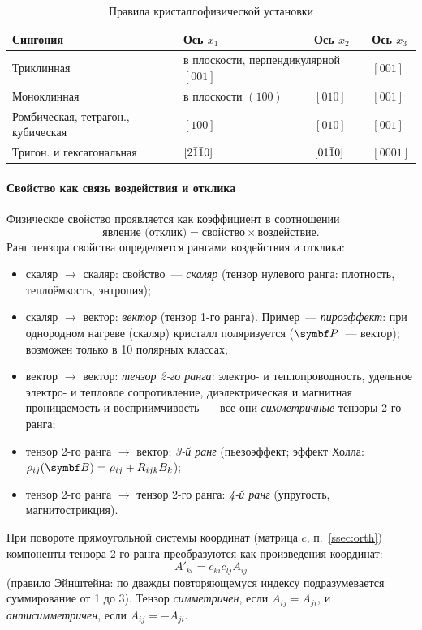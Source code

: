 \begin{table}[ht]
\centering
\caption{Правила кристаллофизической установки}\label{tab:physaxes}
\small
\begin{tabular}{@{}llll@{}}
\toprule
Сингония & Ось $x_1$ & Ось $x_2$ & Ось $x_3$\\
\midrule
Триклинная & \multicolumn{2}{l}{в плоскости, перпендикулярной $[001]$} & $[001]$\\
Моноклинная & в плоскости $(100)$ & $[010]$ & $[001]$\\
Ромбическая, тетрагон., кубическая & $[100]$ & $[010]$ & $[001]$\\
Тригон. и гексагональная & $[2\bar{1}\bar{1}0]$ & $[01\bar{1}0]$ & $[0001]$\\
\bottomrule
\end{tabular}
\end{table}

\paragraph{Свойство как связь воздействия и отклика}
Физическое свойство проявляется как коэффициент в соотношении
\begin{equation}\label{eq:property}
\text{явление (отклик)}=\text{свойство}\times\text{воздействие} .
\end{equation}
Ранг тензора свойства определяется рангами воздействия и отклика:
\begin{itemize}
\item скаляр $\to$ скаляр: свойство~— \emph{скаляр} (тензор нулевого
ранга: плотность, теплоёмкость, энтропия);
\item скаляр $\to$ вектор: \emph{вектор} (тензор 1-го ранга). Пример~—
\emph{пироэффект}: при однородном нагреве (скаляр) кристалл поляризуется
($\vb P$~— вектор); возможен только в 10 полярных классах;
\item вектор $\to$ вектор: \emph{тензор 2-го ранга}: электро- и
теплопроводность, удельное электро- и тепловое сопротивление,
диэлектрическая и магнитная проницаемость и восприимчивость~— все они
\emph{симметричные} тензоры 2-го ранга;
\item тензор 2-го ранга $\to$ вектор: \emph{3-й ранг} (пьезоэффект; эффект
Холла: $\rho_{ij}(\vb B)=\rho_{ij}+R_{ijk}B_k$);
\item тензор 2-го ранга $\to$ тензор 2-го ранга: \emph{4-й ранг} (упругость,
магнитострикция).
\end{itemize}

При повороте прямоугольной системы координат (матрица $c$, п.~\ref{ssec:orth})
компоненты тензора 2-го ранга преобразуются как произведения координат:
\begin{equation}\label{eq:tensor2}
A'_{kl}=c_{ki}c_{lj}A_{ij}
\end{equation}
(правило Эйнштейна: по дважды повторяющемуся индексу подразумевается
суммирование от 1 до 3). Тензор \emph{симметричен}, если $A_{ij}=A_{ji}$, и
\emph{антисимметричен}, если $A_{ij}=-A_{ji}$.

